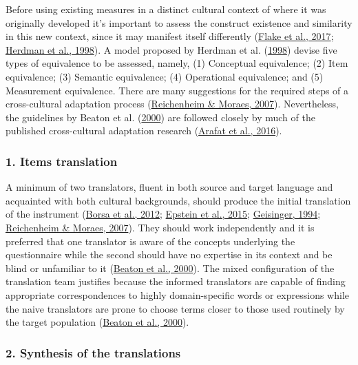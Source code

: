 \documentclass[
  ,doc,11pt, twoside,floatsintext]{apa6}
\begin{document}
Before using existing measures in a distinct cultural context of where it was originally developed it's important to assess the construct existence and similarity in this new context, since it may manifest itself differently (\protect\hyperlink{ref-flakeConstructValidationSocial2017}{Flake et al., 2017}; \protect\hyperlink{ref-herdmanModelEquivalenceCultural1998}{Herdman et al., 1998}). A model proposed by Herdman et al. (\protect\hyperlink{ref-herdmanModelEquivalenceCultural1998}{1998}) devise five types of equivalence to be assessed, namely, (1) Conceptual equivalence; (2) Item equivalence; (3) Semantic equivalence; (4) Operational equivalence; and (5) Measurement equivalence. There are many suggestions for the required steps of a cross-cultural adaptation process (\protect\hyperlink{ref-reichenheim2007}{Reichenheim \& Moraes, 2007}). Nevertheless, the guidelines by Beaton et al. (\protect\hyperlink{ref-beaton2000}{2000}) are followed closely by much of the published cross-cultural adaptation research (\protect\hyperlink{ref-arafat2016}{Arafat et al., 2016}).

\hypertarget{items-translation}{%
\subsubsection{1. Items translation}\label{items-translation}}

A minimum of two translators, fluent in both source and target language and acquainted with both cultural backgrounds, should produce the initial translation of the instrument (\protect\hyperlink{ref-borsaAdaptacaoValidacaoInstrumentos2012}{Borsa et al., 2012}; \protect\hyperlink{ref-epstein2015}{Epstein et al., 2015}; \protect\hyperlink{ref-geisinger1994}{Geisinger, 1994}; \protect\hyperlink{ref-reichenheim2007}{Reichenheim \& Moraes, 2007}). They should work independently and it is preferred that one translator is aware of the concepts underlying the questionnaire while the second should have no expertise in its context and be blind or unfamiliar to it (\protect\hyperlink{ref-beaton2000}{Beaton et al., 2000}). The mixed configuration of the translation team justifies because the informed translators are capable of finding appropriate correspondences to highly domain-specific words or expressions while the naive translators are prone to choose terms closer to those used routinely by the target population (\protect\hyperlink{ref-beaton2000}{Beaton et al., 2000}).

\hypertarget{synthesis-of-the-translations}{%
\subsubsection{2. Synthesis of the translations}\label{synthesis-of-the-translations}}
\end{document}
